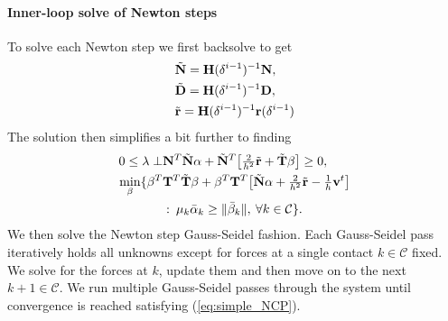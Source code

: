 \paragraph*{Inner-loop solve of Newton steps}
To solve each Newton step we first backsolve to get 
\begin{align}
\begin{split}
&\tilde{\mathbf {N}} = \mathbf {H}(\delta^{i-1})^{-1}  \mathbf {N}, \\
&\tilde{\mathbf {D}} =\mathbf {H}(\delta^{i-1})^{-1}  \mathbf {D}, \\
&\tilde{\mathbf {r}} = \mathbf {H}(\delta^{i-1})^{-1}  \mathbf {r}(\delta^{i-1})
\end{split}
\label{eq:newton_quant}
\end{align}
The solution then simplifies a bit further to finding
\begin{align}
\begin{split}
0 \leq \lambda \perp & \mathbf {N}^T \tilde{\mathbf {N}} \alpha  + \tilde{\mathbf {N}}^T \big[ \tfrac{2}{h^2} \tilde{\mathbf {r}} +  \tilde{\mathbf {T}} \beta \big] \geq 0,\\
\min_{\beta} \{ \beta^T & \mathbf {T}^T  \tilde{\mathbf {T}} \beta + \beta^T \mathbf {T}^T  \big[ \tilde{\mathbf {N}} \alpha  + \tfrac{2}{h^2} \tilde{\mathbf {r}} - \tfrac{1}{h} \mathbf {v}^t \big] \\
& : \> \mu_k \bar{\alpha}_k \geq \|\bar{\beta}_k\|, \> \forall k \in \mathcal{C} \}.
\label{eq:simple_NCP}
\end{split}
\end{align}
We then solve the Newton step Gauss-Seidel fashion. Each Gauss-Seidel pass  iteratively holds all unknowns except for forces at a single contact $k \in \mathcal{C}$ fixed. We solve for the forces at $k$, update them and then move on to the next $k+1\in \mathcal{C}$. We run multiple Gauss-Seidel passes through the system until convergence is reached satisfying (\ref{eq:simple_NCP}). 


